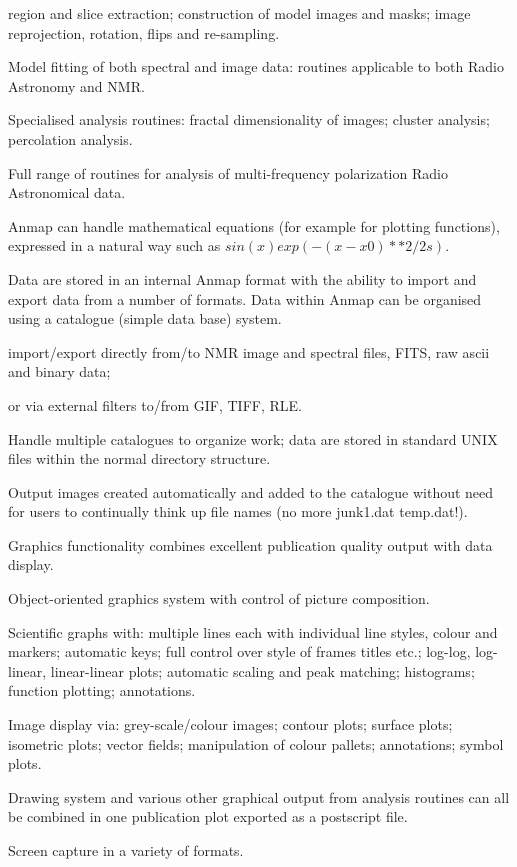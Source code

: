 \begin{npars}
\begin{rpars}
region and slice extraction; construction of model images and
masks; image reprojection, rotation, flips and re-sampling.
\item Model fitting of both spectral and image data: routines
applicable to both Radio Astronomy and NMR.
\item Specialised analysis routines: fractal dimensionality of
images; cluster analysis; percolation analysis.
\item Full range of routines for analysis of multi-frequency
polarization Radio Astronomical data.
\item Anmap can handle mathematical equations (for example for
plotting functions), expressed in a natural way such as
$sin(x) exp(-(x-x0)**2/2s)$.
\end{rpars}
\item Data are stored in an internal Anmap format with the
ability to import and export data from a number of formats.
Data within Anmap can be organised using a catalogue (simple
data base) system.
\begin{rpars}
\item import/export directly from/to NMR image and spectral files, 
FITS, raw ascii and binary data;
\item or via external filters to/from GIF, TIFF, RLE.
\item Handle multiple catalogues to organize work; data are stored
in standard UNIX files within the normal directory structure.
\item  Output images created automatically and added to the
catalogue without need for users to continually think up
file names (no more junk1.dat temp.dat!).
\end{rpars}
\item Graphics functionality combines
excellent publication quality output with data display.
\begin{rpars}
\item Object-oriented graphics system with control of
picture composition.
\item Scientific graphs with: multiple lines each with
individual line styles, colour and markers; automatic
keys; full control over style of frames titles etc.;
log-log, log-linear, linear-linear plots; automatic scaling and
peak matching; histograms; function plotting; annotations.
\item Image display via: grey-scale/colour images; contour
plots; surface plots; isometric plots; vector fields;
manipulation of colour pallets; annotations; symbol plots.
\item Drawing system and various other graphical output
from analysis routines can all be combined in one
publication plot exported as a postscript file.
\item Screen capture in a variety of formats.
\end{rpars}
\end{npars}

